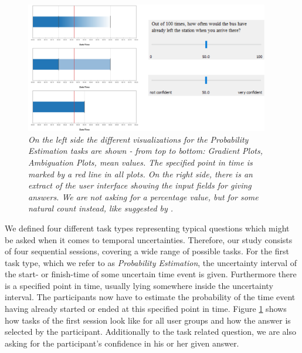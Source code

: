 \begin{figure}[H]
	\centering
	\includegraphics[width=0.95\textwidth]{figures/EvalBench_session1.png}
	\caption{\textit{On the left side the different visualizations for the Probability Estimation tasks are shown - from top to bottom: Gradient Plots, Ambiguation Plots, mean values. The specified point in time is marked by a red line in all plots. On the right side, there is an extract of the user interface showing the input fields for giving answers. We are not asking for a percentage value, but for some natural count instead, like suggested by \citet{hullman2016evaluating}.}}
	\label{fig:EvalBench_session1}
\end{figure}

We defined four different task types representing typical questions which might be asked when it comes to temporal uncertainties. Therefore, our study consists of four sequential sessions, covering a wide range of possible tasks. For the first task type, which we refer to as \textit{Probability Estimation}, the uncertainty interval of the start- or finish-time of some uncertain time event is given. Furthermore there is a specified point in time, usually lying somewhere inside the uncertainty interval. The participants now have to estimate the probability of the time event having already started or ended at this specified point in time. Figure \ref{fig:EvalBench_session1} shows how tasks of the first session look like for all user groups and how the answer is selected by the participant. Additionally to the task related question, we are also asking for the participant's confidence in his or her given answer. \par \medskip

